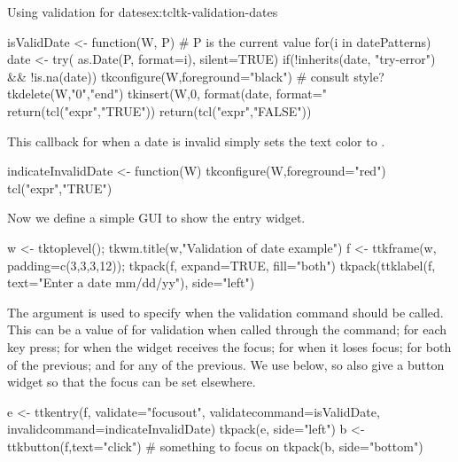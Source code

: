 \begin{example}{Using validation for dates}{ex:tcltk-validation-dates}
\begin{Schunk}
\begin{Sinput}
 isValidDate <- function(W, P) { # P is the current value
   for(i in datePatterns) {
     date <- try( as.Date(P, format=i), silent=TRUE)
     if(!inherits(date, "try-error") && !is.na(date)) {
       tkconfigure(W,foreground="black") #  consult style?
       tkdelete(W,"0","end")
       tkinsert(W,0, format(date, format="%
       return(tcl("expr","TRUE"))        
     } 
   }
   return(tcl("expr","FALSE"))
 }
\end{Sinput}
\end{Schunk}

This callback for when a date is invalid simply sets the text color to . 
\begin{Schunk}
\begin{Sinput}
 indicateInvalidDate <- function(W) {
   tkconfigure(W,foreground="red")
   tcl("expr","TRUE")
 }
\end{Sinput}
\end{Schunk}

Now we define a simple GUI to show the entry widget.
\begin{Schunk}
\begin{Sinput}
 w <- tktoplevel(); tkwm.title(w,"Validation of date example")
 f <- ttkframe(w, padding=c(3,3,3,12)); tkpack(f, expand=TRUE, fill="both")
 tkpack(ttklabel(f, text="Enter a date mm/dd/yy"), side="left")
\end{Sinput}
\end{Schunk}
The  argument is used to specify when the validation command should be called. This can be a value of  for validation when called through the  command;  for each key press;  for when the widget receives the focus;   for when it loses focus;  for both of the previous; and  for any of the previous. We use  below, so also give a button widget so that the focus can be set elsewhere.
\begin{Schunk}
\begin{Sinput}
 e <- ttkentry(f, validate="focusout",
               validatecommand=isValidDate,
               invalidcommand=indicateInvalidDate)
 tkpack(e, side="left")
 b <- ttkbutton(f,text="click")          # something to focus on
 tkpack(b, side="bottom")
\end{Sinput}
\end{Schunk}
              
\end{example}

